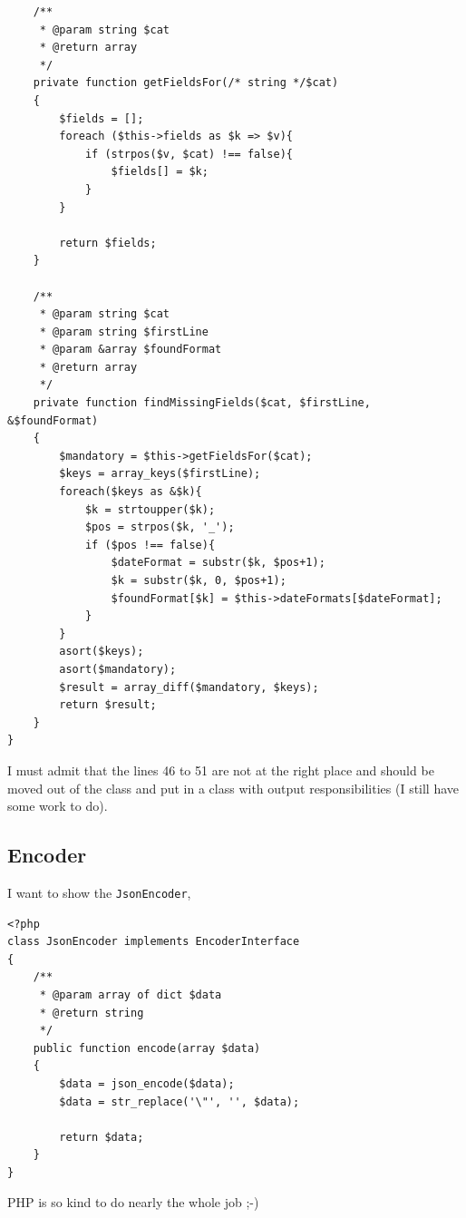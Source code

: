 \documentclass[a4paper, 11pt]{article}
\begin{document}
\begin{lstlisting}
	/**
	 * @param string $cat
	 * @return array
	 */
	private function getFieldsFor(/* string */$cat)
	{
		$fields = [];
		foreach ($this->fields as $k => $v){
			if (strpos($v, $cat) !== false){
				$fields[] = $k;
			}
		}

		return $fields;
	}

	/**
	 * @param string $cat
	 * @param string $firstLine
	 * @param &array $foundFormat
	 * @return array
	 */
	private function findMissingFields($cat, $firstLine, &$foundFormat)
	{
		$mandatory = $this->getFieldsFor($cat);
		$keys = array_keys($firstLine);
		foreach($keys as &$k){
			$k = strtoupper($k);
			$pos = strpos($k, '_');
			if ($pos !== false){
				$dateFormat = substr($k, $pos+1);
				$k = substr($k, 0, $pos+1);
				$foundFormat[$k] = $this->dateFormats[$dateFormat];
			}
		}
		asort($keys);
		asort($mandatory);
		$result = array_diff($mandatory, $keys);
		return $result;
	}
}
\end{lstlisting}
I must admit that the lines 46 to 51 are not at the right place and should be moved out of the class and put in a class with output responsibilities (I still have some work to do).
\subsection{Encoder}
I want to show the \texttt{JsonEncoder}, 
\begin{lstlisting}
<?php
class JsonEncoder implements EncoderInterface
{
	/**
	 * @param array of dict $data
	 * @return string
	 */
	public function encode(array $data)
	{
		$data = json_encode($data);
		$data = str_replace('\"', '', $data);
		
		return $data;
	}
}
\end{lstlisting}
PHP is so kind to do nearly the whole job ;-)
\end{document}
